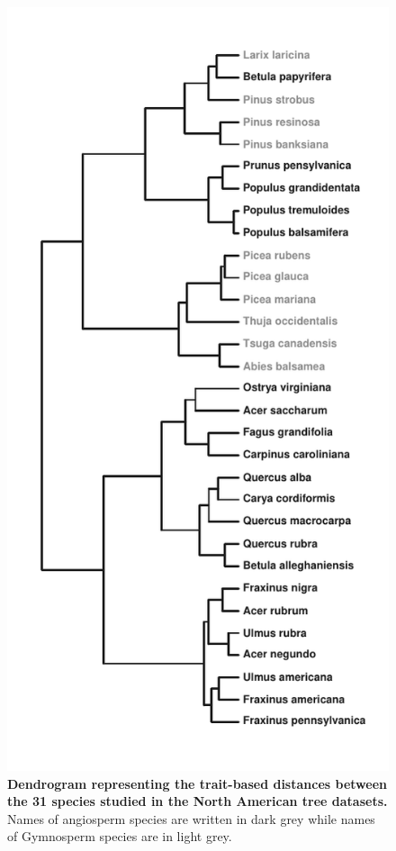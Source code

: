\begin{figure}[htbp]
\centering
\includegraphics[width=.64\textwidth]{chapitre3/figS2.pdf}
\caption[Dendrogram representing the trait-based distances
between the 31 species studied in the North American tree datasets.]{\textbf{Dendrogram representing the trait-based distances
between the 31 species studied in the North American tree datasets.}
Names of angiosperm species are written in dark grey while names of
Gymnosperm species are in light grey.\label{fig:dendro}}
\end{figure}

\newpage

